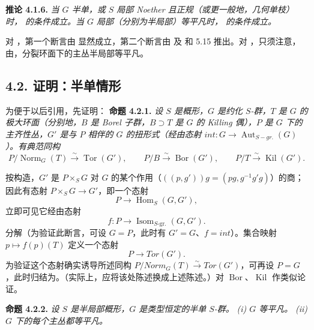 \textbf{推论 4.1.6.} \emph{当 \(G\) 半单，或 \(S\) 局部 Noether 且正规（或更一般地，几何单枝）时， 的条件成立。当 \(G\) 局部（分别为半局部）等平凡时， 的条件成立。}

对 ，第一个断言由  显然成立，第二个断言由  及 和 5.15 推出。对 ，只须注意，由，分裂环面下的主丛半局部等平凡。

\subsection*{4.2. 证明：半单情形}
为便于以后引用，先证明：
\textbf{命题 4.2.1.} \emph{设 \(S\) 是概形，\(G\) 是约化 \(S\)-群，\(T\) 是 \(G\) 的极大环面（分别地，\(B\) 是 Borel 子群，\(B \supset T\) 是 \(G\) 的 Killing 偶），\(P\) 是 \(G\) 下的主齐性丛，\(G'\) 是与 \(P\) 相伴的 \(G\) 的扭形式（经由态射 \(int : G \to \operatorname{Aut}_{S-gr.}(G)\)）。有典范同构}
\[
  P/\operatorname{Norm}_G(T)\xrightarrow{\sim}\operatorname{Tor}(G'),
  \qquad
  P/B\xrightarrow{\sim}\operatorname{Bor}(G'),
  \qquad
  P/T\xrightarrow{\sim}\operatorname{Kil}(G').
\]

按构造，\(G'\) 是 \(P \times_{S} G\) 对 \(G\) 的某个作用（\(((p, g')) g = (pg, g^{-1} g'g)\)）的商；因此有态射 \(P \times_{S} G \to G'\)，即一个态射
\[ P \to \operatorname{Hom}_{S}(G, G'), \]
立即可见它经由态射
\[
  f:P\longrightarrow\operatorname{Isom}_{S\text{-}\mathrm{gr.}}(G,G').
\]
分解（为验证此断言，可设 \(G = P\)，此时有 \(G' = G\)、\(f = int\)）。集合映射 \(p\mapsto f(p)(T)\) 定义一个态射
\[ P \to Tor(G'). \]
为验证这个态射确实诱导所述同构 \(P / Norm_{G}(T) \xrightarrow{\sim} Tor(G')\)，可再设 \(P = G\)，此时归结为。（实际上，应将该处陈述换成上述陈述。）对 \(\operatorname{Bor}\)、\(\operatorname{Kil}\) 作类似论证。

\textbf{命题 4.2.2.} \emph{设 \(S\) 是半局部概形，\(G\) 是类型恒定的半单 \(S\)-群。}
\emph{(i) \(G\) 等平凡。}
\emph{(ii) \(G\) 下的每个主丛都等平凡。}

